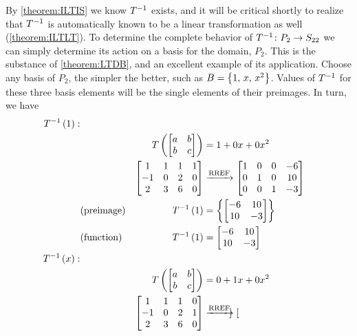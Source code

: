 \documentclass{ximera}
\begin{document}
\begin{example}
By \ref{theorem:ILTIS} we know $T^{-1}$ exists, and it will be critical shortly to realize that $T^{-1}$ is automatically known to be a linear transformation as well (\ref{theorem:ILTLT}).  To determine the complete behavior of $T^{-1}\colon P_2\rightarrow S_{22}$ we can simply determine its action on a basis for the domain, $P_2$.  This is the substance of \ref{theorem:LTDB}, and an excellent example of its application.   Choose any basis of $P_2$, the simpler the better, such as $B=\left\{1,\,x,\,x^2\right\}$.  Values of $T^{-1}$ for these three basis elements will be the single elements of their preimages.  In turn, we have
\begin{align*}
T^{-1}\left(1\right):&\\
&&T\left(\begin{bmatrix}a&b\\b&c\end{bmatrix}\right)
&=1+0x+0x^2\\
&&\begin{bmatrix}
 1 & 1 & 1 & 1\\
 -1 & 0 & 2 & 0\\
 2 & 3 & 6 & 0
\end{bmatrix}
&\xrightarrow{\text{RREF}}
\begin{bmatrix}
1 & 0 & 0& -6 \\
0 & 1 & 0& 10 \\
0 & 0 & 1& -3
\end{bmatrix}
\\
&\text{(preimage)}&T^{-1}\left(1\right)
&=\left\{\begin{bmatrix}-6&10\\10&-3\end{bmatrix}\right\}\\
&\text{(function)}&T^{-1}\left(1\right)
&=
\begin{bmatrix}-6&10\\10&-3\end{bmatrix}\\
T^{-1}\left(x\right):&\\
&&T\left(\begin{bmatrix}a&b\\b&c\end{bmatrix}\right)
&=0+1x+0x^2\\
&&\begin{bmatrix}
 1 & 1 & 1 & 0\\
 -1 & 0 & 2 & 1\\
 2 & 3 & 6 & 0
\end{bmatrix}
&\xrightarrow{\text{RREF}}
\begin{bmatrix}

\end{bmatrix}
\end{align*}
\end{example}
\end{document}
